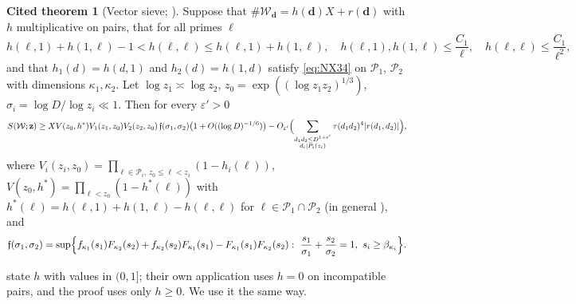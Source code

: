 \documentclass[11pt,reqno]{amsart}
\theoremstyle{definition}
\newtheorem{citedthm}[theorem]{Cited theorem}
\begin{document}
\begin{citedthm}[Vector sieve; {\cite[Prop.~3.10]{NX}}]\label{cit:vector}
Suppose that $\#\mathcal W_{\mathbf d}=h(\mathbf d)X+r(\mathbf d)$ with $h$
multiplicative on pairs, that for all primes $\ell$
\begin{equation}\label{eq:A2}
h(\ell,1)+h(1,\ell)-1<h(\ell,\ell)\le h(\ell,1)+h(1,\ell),\quad h(\ell,1),h(1,\ell)\le\frac{C_1}\ell,\quad h(\ell,\ell)\le\frac{C_1}{\ell^2},
\end{equation}
and that $h_1(d)=h(d,1)$ and $h_2(d)=h(1,d)$ satisfy \eqref{eq:NX34} on
$\mathcal P_1$, $\mathcal P_2$ with dimensions $\kappa_1,\kappa_2$.  Let
$\log z_1\asymp\log z_2$, $z_0=\exp((\log z_1z_2)^{1/3})$,
$\sigma_i=\log D/\log z_i\ll1$.  Then for every $\varepsilon'>0$
\[
S(\mathcal W;\mathbf z)\ge XV(z_0,h^*)V_1(z_1,z_0)V_2(z_2,z_0)\,\mathfrak f(\sigma_1,\sigma_2)\bigl(1+O((\log D)^{-1/6})\bigr)
-O_{\varepsilon'}\Bigl(\sum_{\substack{d_1d_2\le D^{1+\varepsilon'}\\ d_i\mid P_i(z_i)}}\tau(d_1d_2)^4|r(d_1,d_2)|\Bigr),
\]
where $V_i(z_i,z_0)=\prod_{\ell\in\mathcal P_i,\,z_0\le\ell<z_i}(1-h_i(\ell))$,
$V(z_0,h^*)=\prod_{\ell<z_0}(1-h^*(\ell))$ with
$h^*(\ell)=h(\ell,1)+h(1,\ell)-h(\ell,\ell)$ for
$\ell\in\mathcal P_1\cap\mathcal P_2$ (in general \cite[(3.10)]{NX}), and
\[
\mathfrak f(\sigma_1,\sigma_2)=\sup\Bigl\{f_{\kappa_1}(s_1)F_{\kappa_2}(s_2)+f_{\kappa_2}(s_2)F_{\kappa_1}(s_1)-F_{\kappa_1}(s_1)F_{\kappa_2}(s_2):\ \frac{s_1}{\sigma_1}+\frac{s_2}{\sigma_2}=1,\ s_i\ge\beta_{\kappa_i}\Bigr\}.
\]
\end{citedthm}

\cite{NX} state $h$ with values in $(0,1]$; their own application
\cite[(4.3)]{NX} uses $h=0$ on incompatible pairs, and the proof uses only
$h\ge0$.  We use it the same way.
\end{document}
